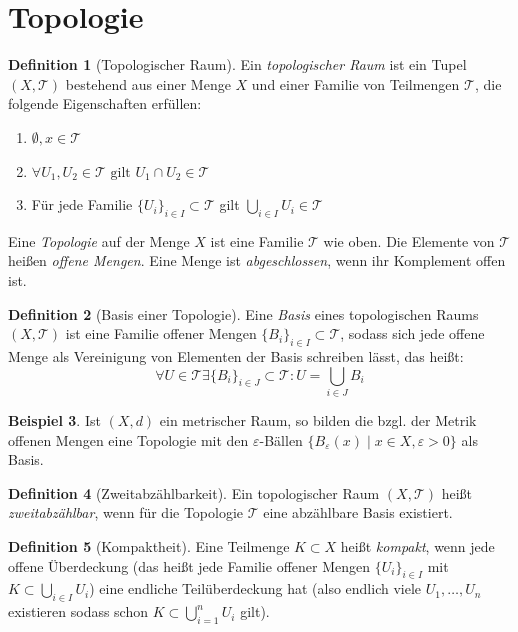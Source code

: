 \documentclass[a4paper]{scrreprt}
\numberwithin{equation}{chapter}
\theoremstyle{definition}
\newtheorem{defn}{Definition}[section]
\newtheorem{bsp}[defn]{Beispiel}
\begin{document}
	\section{Topologie}
		\begin{defn}[Topologischer Raum]
			Ein \emph{topologischer Raum} ist ein Tupel $(X,\mathcal{T})$ bestehend aus einer Menge $X$ und einer Familie von Teilmengen $\mathcal{T}$, die folgende Eigenschaften erfüllen:
			\begin{enumerate}[label=$T$\arabic*]
				\item $\emptyset, x\in \mathcal{T}$
				\item $\forall U_1, U_2\in \mathcal{T} \text{ gilt }U_1\cap U_2\in\mathcal{T}$
				\item Für jede Familie $\lbrace U_i\rbrace_{i\in I}\subset \mathcal{T}$ gilt $\bigcup_{i\in I}U_i\in\mathcal{T}$
			\end{enumerate}
			Eine \emph{Topologie} auf der Menge $X$ ist eine Familie $\mathcal{T}$ wie oben. Die Elemente von $\mathcal{T}$ heißen \emph{offene Mengen}. Eine Menge ist \emph{abgeschlossen}, wenn ihr Komplement offen ist.
		\end{defn}
		\begin{defn}[Basis einer Topologie]
			Eine \emph{Basis} eines topologischen Raums $(X,\mathcal{T})$ ist eine Familie offener Mengen $\lbrace B_i\rbrace_{i\in I}\subset \mathcal{T}$, sodass sich jede offene Menge als Vereinigung von Elementen der Basis schreiben lässt, das heißt:
			\begin{equation*}
				\forall U\in\mathcal{T}\exists \lbrace B_i\rbrace_{i\in J}\subset \mathcal{T}: U=\bigcup_{i\in J}B_i
			\end{equation*}
		\end{defn}
		\begin{bsp}
			Ist $(X,d)$ ein metrischer Raum, so bilden die bzgl. der Metrik offenen Mengen eine Topologie mit den $\varepsilon$-Bällen $\lbrace B_{\varepsilon}(x)\mid x\in X, \varepsilon >0\rbrace$ als Basis.
		\end{bsp}
		\begin{defn}[Zweitabzählbarkeit]
			Ein topologischer Raum $(X,\mathcal{T})$ heißt \emph{zweitabzählbar}, wenn für die Topologie $\mathcal{T}$ eine abzählbare Basis existiert. 
		\end{defn}
		\begin{defn}[Kompaktheit]
			Eine Teilmenge $K\subset X$ heißt \emph{kompakt}, wenn jede offene Überdeckung (das heißt jede Familie offener Mengen $\lbrace U_i\rbrace_{i\in I}$ mit $K\subset \bigcup_{i\in I}U_i$) eine endliche Teilüberdeckung hat (also endlich viele $U_1,\ldots,U_n$ existieren sodass schon $K\subset \bigcup_{i=1}^n U_i$ gilt).
		\end{defn}
\end{document}

